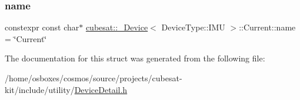 \subsubsection{\texorpdfstring{name}{name}}
{\footnotesize\ttfamily constexpr const char$\ast$ \hyperlink{structcubesat_1_1__Device}{cubesat\+::\+\_\+\+Device}$<$ Device\+Type\+::\+I\+MU $>$\+::Current\+::name = \char`\"{}Current\char`\"{}\hspace{0.3cm}{\ttfamily [static]}}



The documentation for this struct was generated from the following file\+:\begin{DoxyCompactItemize}
\item 
/home/osboxes/cosmos/source/projects/cubesat-\/kit/include/utility/\hyperlink{DeviceDetail_8h}{Device\+Detail.\+h}\end{DoxyCompactItemize}
